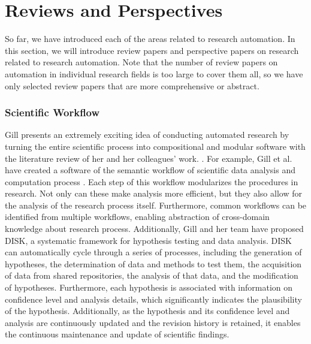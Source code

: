 \section{Reviews and Perspectives}
So far, we have introduced each of the areas related to research automation. In this section, we will introduce review papers and perspective papers on research related to research automation. Note that the number of review papers on automation in individual research fields is too large to cover them all, so we have only selected review papers that are more comprehensive or abstract.

\subsubsection{Scientific Workflow}
Gill presents an extremely exciting idea of conducting automated research by turning the entire scientific process into compositional and modular software with the literature review of her and her colleagues' work. \cite{gil2022will}. For example, Gill et al. have created a software of the semantic workflow of scientific data analysis and computation process  \cite{gil2011semantic}. 
Each step of this workflow modularizes the procedures in research. Not only can these make analysis more efficient, but they also allow for the analysis of the research process itself. Furthermore, common workflows can be identified from multiple workflows, enabling abstraction of cross-domain knowledge about research process. Additionally, Gill and her team have proposed DISK, a systematic framework for hypothesis testing and data analysis. DISK can automatically cycle through a series of processes, including the generation of hypotheses, the determination of data and methods to test them, the acquisition of data from shared repositories, the analysis of that data, and the modification of hypotheses. Furthermore, each hypothesis is associated with information on confidence level and analysis details, which significantly indicates the plausibility of the hypothesis. Additionally, as the hypothesis and its confidence level and analysis are continuously updated and the revision history is retained, it enables the continuous maintenance and update of scientific findings.

